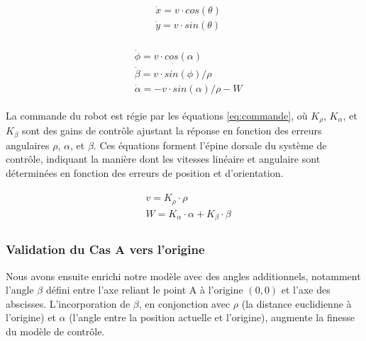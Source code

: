 \begin{align}
\begin{split}
    & \dot{x} = v \cdot cos(\theta) \\
    & \dot{y} = v \cdot sin(\theta)
    \label{eq:eq_dyn_cartesian}
\end{split}
\end{align}


\begin{align}
\begin{split}
    &\dot{\phi} = v \cdot cos(\alpha) \\
    &\dot{\beta} = v \cdot sin(\phi)/\rho \\
    &\dot{\alpha} = -v \cdot sin(\alpha)/\rho - W
    \label{eq:eq_dyn_polaire}
\end{split}
\end{align}


La commande du robot est régie par les équations \ref{eq:commande}, où $K_\rho$, $K_\alpha$, et $K_\beta$ sont des gains de contrôle ajustant la réponse en fonction des erreurs angulaires $\rho$, $\alpha$, et $\beta$. Ces équations forment l'épine dorsale du système de contrôle, indiquant la manière dont les vitesses linéaire et angulaire sont déterminées en fonction des erreurs de position et d'orientation.


\begin{align}
\begin{split}
    & v = K_{\rho} \cdot \rho \\
    & W = K_{\alpha} \cdot \alpha + K_{\beta} \cdot \beta
    \label{eq:commande}
\end{split}
\end{align}


\subsubsection{Validation du Cas A vers l’origine}


Nous avons ensuite enrichi notre modèle avec des angles additionnels, notamment l'angle $\beta$ défini entre l'axe reliant le point A à l'origine $(0,0)$ et l'axe des abscisses. L'incorporation de $\beta$, en conjonction avec $\rho$ (la distance euclidienne à l'origine) et $\alpha$ (l'angle entre la position actuelle et l'origine), augmente la finesse du modèle de contrôle.

